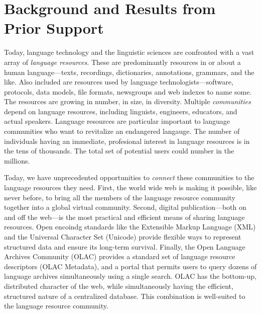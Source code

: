 \section{Background and Results from Prior Support}


Today, language technology and the linguistic sciences are confronted
with a vast array of \emph{language resources}.  These are
predominantly resources in or about a human language---texts, recordings, 
dictionaries, annotations, grammars, and the like.
Also included are resources used by language technologists---software,
protocols, data models, file formats, newsgroups and web
indexes to name some.  The resources are growing
in number, in size, in diversity.  Multiple \emph{communities} depend
on language resources, including linguists, engineers, educators, and
actual speakers.  Language resources are particular important to 
language communities who want to revitalize an endangered langauge.
The number of individuals having an immediate, profesional interest in language
resources is in the tens of thousands. The total set of potential users
could number in the millions.


Today, we have unprecedented opportunities to \emph{connect} these
communities to the language resources they need.  First, 
the world wide web is making it possible, like never before, to bring
all the members of the language resource community together into 
a global virtual community. 
Second, digital publication---both on and off
the web---is the most practical and efficient means of
sharing language resources.  
Open encoindg standards like the Extensible Markup Language (XML) 
and the Universal Character Set (Unicode)
provide flexible ways to represent structured data and ensure its
long-term survival. 
Finally, the Open Language Archives Community (OLAC) provides a 
standard set of language resource descriptors (OLAC Metadata), 
and a portal that permits users to query dozens of language 
archives simultaneously using a single search. OLAC has the
bottom-up, distributed character of the web, while simultaneously
having the efficient, structured nature of a centralized database.
This combination is well-suited to the language resource community.

